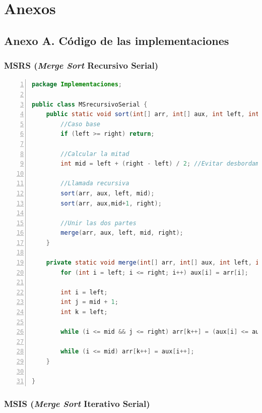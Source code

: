 \documentclass[titlepage]{article}
\begin{document}
\newpage
\section*{Anexos}

\subsection*{Anexo A. Código de las implementaciones}

\subsubsection*{MSRS (\textit{Merge Sort} Recursivo Serial)}

	\begin{lstlisting}[language=java, frame=single, numbers=left, float=h]
package Implementaciones;

public class MSrecursivoSerial {
	public static void sort(int[] arr, int[] aux, int left, int right) {
		//Caso base
		if (left >= right) return;
		
		//Calcular la mitad
		int mid = left + (right - left) / 2; //Evitar desbordamiento de Integer.MAX_VALUE
		
		//Llamada recursiva
		sort(arr, aux, left, mid);
		sort(arr, aux,mid+1, right);
		
		//Unir las dos partes
		merge(arr, aux, left, mid, right);
	}
	
	private static void merge(int[] arr, int[] aux, int left, int mid, int right) {
		for (int i = left; i <= right; i++) aux[i] = arr[i];
		
		int i = left;       
		int j = mid + 1;    
		int k = left;       
		
		while (i <= mid && j <= right) arr[k++] = (aux[i] <= aux[j])? aux[i++] : aux[j++];
		
		while (i <= mid) arr[k++] = aux[i++];
	}
	
}
	\end{lstlisting}


\newpage

\subsubsection*{MSIS (\textit{Merge Sort} Iterativo Serial)}
\end{document}

